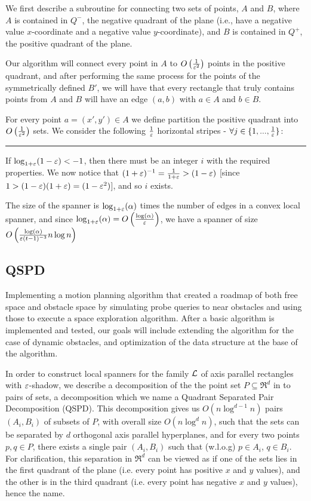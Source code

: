 \documentclass[12pt]{article}%
\begin{document}
We first describe a subroutine for connecting two sets of points, $A$
and $B$, where $A$ is contained in $Q^-$, the negative quadrant of the
plane (i.e., have a negative value $x$-coordinate and a negative value
$y$-coordinate), and $B$ is contained in $Q^+$, the positive quadrant
of the plane.

Our algorithm will connect every point in $A$ to
$O\left(\frac{1}{\varepsilon^2}\right)$ points in the positive quadrant, and
after performing the same process for the points of the symmetrically
defined $B'$, we will have that every rectangle that truly contains
points from $A$ and $B$ will have an edge $(a,b)$ with $a\in A$ and
$b\in B$.

For every point $a = (x',y') \in A$ we define partition the positive
quadrant into $O\left(\frac{1}{\varepsilon^2}\right)$ sets. We consider the
following $\frac{1}{\varepsilon}$ horizontal stripes -
$\forall j\in \{1,...,\frac{1}{\varepsilon}\}$:

\hrule

If $\log_{1+\varepsilon}(1-\varepsilon)<-1$, then there must be an integer $i$ with
the required properties. We now notice that
$(1+\varepsilon)^{-1}=\frac{1}{1+\varepsilon}>(1-\varepsilon)$ [since
$1>(1-\varepsilon)(1+\varepsilon)=(1-\varepsilon^2)$], and so $i$ exists.

The size of the spanner is $\log_{1+\varepsilon}(\alpha)$ times the number of
edges in a convex local spanner, and since
$\log_{1+\varepsilon}(\alpha)=O\left(\frac{\log(\alpha)}{\varepsilon}\right)$, we
have a spanner of size
$O\left(\frac{\log(\alpha)}{\varepsilon (t-1)^{-3}}n\log n\right)$

\subsection{QSPD}
Implementing a motion planning algorithm that created a roadmap of
both free space and obstacle space by simulating probe queries to near
obstacles and using those to execute a space exploration algorithm.
After a basic algorithm is implemented and tested, our goals will
include extending the algorithm for the case of dynamic obstacles, and
optimization of the data structure at the base of the algorithm.

In order to construct local spanners for the family $\mathcal{L}$ of axis
parallel rectangles with $\varepsilon$-shadow, we describe a decomposition of
the the point set $P\subseteq \Re^d$ in to pairs of sets, a
decomposition which we name a Quadrant Separated Pair Decomposition
(QSPD). This decomposition gives us $O(n\log^{d-1}n)$ pairs
$(A_i,B_i)$ of subsets of $P$, with overall size $O(n\log^{d}n)$, such
that the sets can be separated by $d$ orthogonal axis parallel
hyperplanes, and for every two points $p,q\in P$, there exists a
single pair $(A_i,B_i)$ such that (w.l.o.g) $p\in A_i$, $q\in
B_i$. For clarification, this separation in $\Re^d$ can be viewed as
if one of the sets lies in the first quadrant of the plane (i.e. every
point has positive $x$ and $y$ values), and the other is in the third
quadrant (i.e. every point has negative $x$ and $y$ values), hence the
name.
\end{document}

